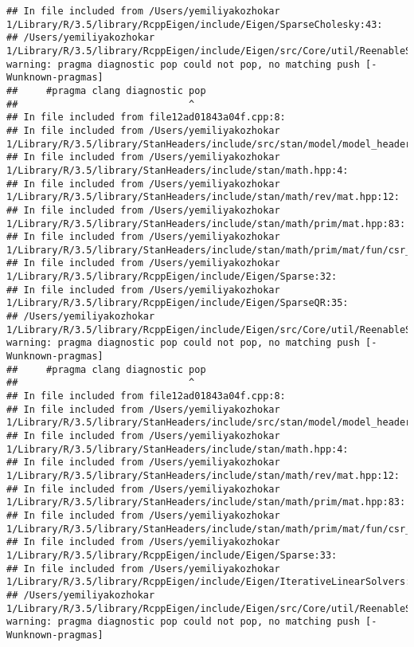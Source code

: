 \documentclass[]{article}
\begin{document}
\begin{verbatim}
## In file included from /Users/yemiliyakozhokar 1/Library/R/3.5/library/RcppEigen/include/Eigen/SparseCholesky:43:
## /Users/yemiliyakozhokar 1/Library/R/3.5/library/RcppEigen/include/Eigen/src/Core/util/ReenableStupidWarnings.h:10:30: warning: pragma diagnostic pop could not pop, no matching push [-Wunknown-pragmas]
##     #pragma clang diagnostic pop
##                              ^
## In file included from file12ad01843a04f.cpp:8:
## In file included from /Users/yemiliyakozhokar 1/Library/R/3.5/library/StanHeaders/include/src/stan/model/model_header.hpp:4:
## In file included from /Users/yemiliyakozhokar 1/Library/R/3.5/library/StanHeaders/include/stan/math.hpp:4:
## In file included from /Users/yemiliyakozhokar 1/Library/R/3.5/library/StanHeaders/include/stan/math/rev/mat.hpp:12:
## In file included from /Users/yemiliyakozhokar 1/Library/R/3.5/library/StanHeaders/include/stan/math/prim/mat.hpp:83:
## In file included from /Users/yemiliyakozhokar 1/Library/R/3.5/library/StanHeaders/include/stan/math/prim/mat/fun/csr_extract_u.hpp:6:
## In file included from /Users/yemiliyakozhokar 1/Library/R/3.5/library/RcppEigen/include/Eigen/Sparse:32:
## In file included from /Users/yemiliyakozhokar 1/Library/R/3.5/library/RcppEigen/include/Eigen/SparseQR:35:
## /Users/yemiliyakozhokar 1/Library/R/3.5/library/RcppEigen/include/Eigen/src/Core/util/ReenableStupidWarnings.h:10:30: warning: pragma diagnostic pop could not pop, no matching push [-Wunknown-pragmas]
##     #pragma clang diagnostic pop
##                              ^
## In file included from file12ad01843a04f.cpp:8:
## In file included from /Users/yemiliyakozhokar 1/Library/R/3.5/library/StanHeaders/include/src/stan/model/model_header.hpp:4:
## In file included from /Users/yemiliyakozhokar 1/Library/R/3.5/library/StanHeaders/include/stan/math.hpp:4:
## In file included from /Users/yemiliyakozhokar 1/Library/R/3.5/library/StanHeaders/include/stan/math/rev/mat.hpp:12:
## In file included from /Users/yemiliyakozhokar 1/Library/R/3.5/library/StanHeaders/include/stan/math/prim/mat.hpp:83:
## In file included from /Users/yemiliyakozhokar 1/Library/R/3.5/library/StanHeaders/include/stan/math/prim/mat/fun/csr_extract_u.hpp:6:
## In file included from /Users/yemiliyakozhokar 1/Library/R/3.5/library/RcppEigen/include/Eigen/Sparse:33:
## In file included from /Users/yemiliyakozhokar 1/Library/R/3.5/library/RcppEigen/include/Eigen/IterativeLinearSolvers:46:
## /Users/yemiliyakozhokar 1/Library/R/3.5/library/RcppEigen/include/Eigen/src/Core/util/ReenableStupidWarnings.h:10:30: warning: pragma diagnostic pop could not pop, no matching push [-Wunknown-pragmas]

\end{verbatim}
\end{document}
